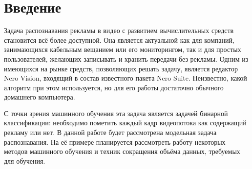 \section{Введение}
Задача распознавания рекламы в видео с развитием вычислительных средств становится всё более доступной. Она является актуальной как для компаний, занимающихся кабельным вещанием или его мониторингом, так и для простых пользователей, желающих записывать и хранить передачи без рекламы.
Одним из имеющихся на рынке средств, позволяющих решать задачу, является редактор Nero Vision, входящий в состав известного пакета Nero Suite. Неизвестно, какой алгоритм при этом используется, но для его работы достаточно обычного домашнего компьютера.
\par
С точки зрения машинного обучения эта задача является задачей бинарной классификации: необходимо пометить каждый кадр видеопотока как содержащий рекламу или нет. В данной работе будет рассмотрена модельная задача распознавания. На её примере планируется рассмотреть работу некоторых методов машинного обучения и техник сокращения объёма данных, требуемых для обучения.